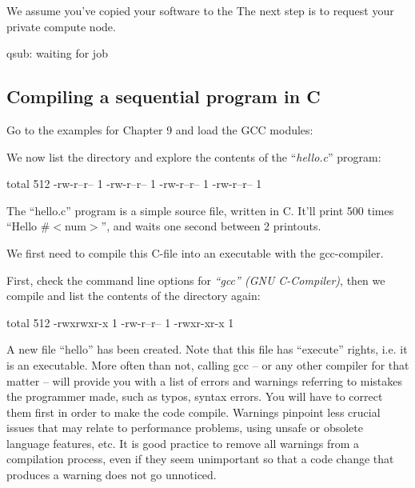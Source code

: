 We assume you've copied your software to the \hpc The next step is to request your private compute node.
\begin{prompt}
qsub: waiting for job %
\end{prompt}

\subsection{Compiling a sequential program in C}

Go to the examples for Chapter 9 and load the GCC modules:
\begin{prompt}
\end{prompt}

We now list the directory and explore the contents of the ``\emph{hello.c}''
program:

\begin{prompt}
total 512
-rw-r--r-- 1 %
-rw-r--r-- 1 %
-rw-r--r-- 1 %
-rw-r--r-- 1 %
\end{prompt}


The ``hello.c'' program is a simple source file, written in C. It'll print 500
times ``Hello \#$<$num$>$'', and waits one second between 2 printouts.

We first need to compile this C-file into an executable with the gcc-compiler.

First, check the command line options for \emph{``gcc'' (GNU C-Compiler)},
then we compile and list the contents of the directory again:

\begin{prompt}
total 512
-rwxrwxr-x 1 %
-rw-r--r-- 1 %
-rwxr-xr-x 1 %
\end{prompt}

A new file ``hello'' has been created. Note that this file has ``execute''
rights, i.e. it is an executable. More often than not, calling gcc -- or any
other compiler for that matter -- will provide you with a list of errors and
warnings referring to mistakes the programmer made, such as typos, syntax
errors. You will have to correct them first in order to make the code compile.
Warnings pinpoint less crucial issues that may relate to performance problems,
using unsafe or obsolete language features, etc. It is good practice to remove
all warnings from a compilation process, even if they seem unimportant so that
a code change that produces a warning does not go unnoticed.

